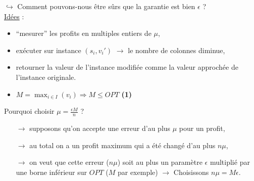 \documentclass[12pt]{article}
\begin{document}
$\hookrightarrow$ Comment pouvons-nous être sûrs que la garantie est bien $\epsilon$ ?\\
\underline{Idées} :
\begin{itemize}
\item ``mesurer'' les profits en multiples entiers de $\mu$,
\item exécuter sur instance $(s_i,v_i')$ $\rightarrow$ le nombre de colonnes diminue,
\item retourner la valeur de l'instance modifiée comme la valeur approchée de l'instance originale.
\item $M = \max_{i\in I}(v_i) \Rightarrow M \leq OPT$ \textbf{(1)} \\
\end{itemize}

Pourquoi choisir $\mu = \frac{\epsilon M}{n}$ ?
\begin{itemize}
\item[$\rightarrow$] supposons qu'on accepte une erreur d'au plus $\mu$ pour un profit,
\item[$\rightarrow$] au total on a un profit maximum qui a été changé d'au plus $n\mu$,
\item[$\rightarrow$] on veut que cette erreur ($n\mu$) soit au plus un paramètre $\epsilon$ multiplié par une borne inférieur sur $OPT$ ($M$
par exemple) $\longrightarrow$ Choisissons $n\mu = M\epsilon$.
\end{itemize}
\end{document}
